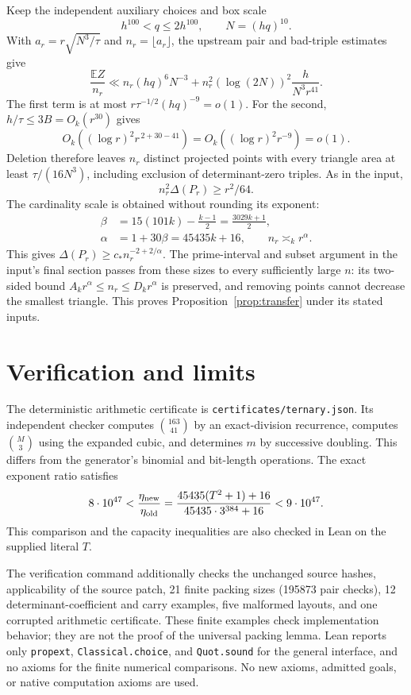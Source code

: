 \documentclass[11pt]{article}
\newcommand{\E}{\mathbb E}
\begin{document}
Keep the independent auxiliary choices and box scale
\[
 h^{100}<q\le2h^{100},\qquad N=(hq)^{10}.
\]
With \(a_r=r\sqrt{N^3/\tau}\) and \(n_r=\lfloor a_r\rfloor\),
the upstream pair and bad-triple estimates give
\[
 \frac{\E Z}{n_r}
 \ll n_r(hq)^6N^{-3}
   + n_r^2(\log(2N))^2\frac{h}{N^3r^{41}}.
\]
The first term is at most \(r\tau^{-1/2}(hq)^{-9}=o(1)\).
For the second, \(h/\tau\le3B=O_k(r^{30})\) gives
\[
 O_k((\log r)^2r^{\,2+30-41})
       =O_k((\log r)^2r^{-9})=o(1).
\]
Deletion therefore leaves \(n_r\) distinct projected points with
every triangle area at least \(\tau/(16N^3)\), including exclusion
of determinant-zero triples. As in the input,
\[
 n_r^2\Delta(P_r)\ge r^2/64.
\]
The cardinality scale is obtained without rounding its exponent:
\[
 \begin{split}
 \beta&=15(101k)-\frac{k-1}{2}
         =\frac{3029k+1}{2},\\
 \alpha&=1+30\beta=45435k+16,\qquad
 n_r\asymp_k r^\alpha.
 \end{split}
\]
This gives \(\Delta(P_r)\ge c_*n_r^{-2+2/\alpha}\).
The prime-interval and subset argument in the input's final section
passes from these sizes to every sufficiently large \(n\): its
two-sided bound \(A_kr^\alpha\le n_r\le D_kr^\alpha\) is preserved,
and removing points cannot decrease the smallest triangle.
This proves Proposition~\ref{prop:transfer} under its stated inputs.

\section{Verification and limits}
The deterministic arithmetic certificate is
\texttt{certificates/ternary.json}. Its independent checker computes
\(\binom{163}{41}\) by an exact-division recurrence, computes
\(\binom{M}{3}\) using the expanded cubic, and determines \(m\) by
successive doubling. This differs from the generator's binomial and
bit-length operations.
The exact exponent ratio satisfies
\[
 8\cdot10^{47}<
 \frac{\eta_{\rm new}}{\eta_{\rm old}}
 =\frac{45435(T^2+1)+16}{45435\cdot3^{384}+16}
 <9\cdot10^{47}.
\]
This comparison and the capacity inequalities are also checked
in Lean on the supplied literal \(T\).

The verification command additionally checks the unchanged source
hashes, applicability of the source patch, 21 finite packing sizes
(195873 pair checks), 12 determinant-coefficient and carry examples,
five malformed layouts, and one corrupted arithmetic certificate.
These finite examples check implementation behavior; they are not
the proof of the universal packing lemma.
Lean reports only \texttt{propext}, \texttt{Classical.choice}, and
\texttt{Quot.sound} for the general interface, and no axioms for
the finite numerical comparisons. No new axioms, admitted goals,
or native computation axioms are used.
\end{document}
